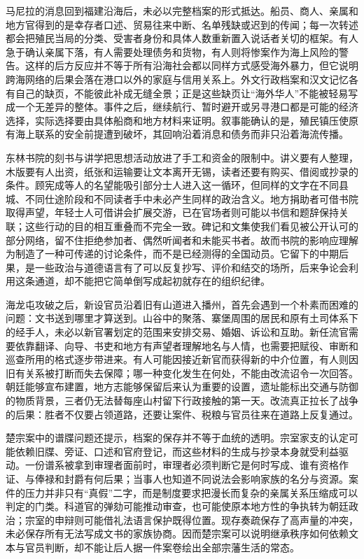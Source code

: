 马尼拉的消息回到福建沿海后，未必以完整档案的形式抵达。船员、商人、亲属和地方官得到的是幸存者口述、贸易往来中断、名单残缺或迟到的传闻；每一次转述都会把殖民当局的分类、受害者身份和具体人数重新置入说话者关切的框架。有人急于确认亲属下落，有人需要处理债务和货物，有人则将惨案作为海上风险的警告。这样的后方反应并不等于所有沿海社会都以同样方式感受海外暴力，但它说明跨海网络的后果会落在港口以外的家庭与信用关系上。外文行政档案和汉文记忆各有自己的缺页，不能彼此补成无缝全景；正是这些缺页让“海外华人”不能被轻易写成一个无差异的整体。事件之后，继续航行、暂时避开或另寻港口都是可能的经济选择，实际选择要由具体船商和地方材料来证明。叙事能确认的是，殖民镇压使原有海上联系的安全前提遭到破坏，其回响沿着消息和债务而非只沿着海流传播。

东林书院的刻书与讲学把思想活动放进了手工和资金的限制中。讲义要有人整理，木版要有人出资，纸张和运输要让文本离开无锡，读者还要有购买、借阅或抄录的条件。顾宪成等人的名望能吸引部分士人进入这一循环，但同样的文字在不同县城、不同仕途阶段和不同读者手中未必产生同样的政治含义。地方捐助者可借书院取得声望，年轻士人可借讲会扩展交游，已在官场者则可能以书信和题辞保持关联；这些行动的目的相互重叠而不完全一致。碑记和文集使我们看见被公开认可的部分网络，留不住拒绝参加者、偶然听闻者和未能买书者。故而书院的影响应理解为制造了一种可传递的讨论条件，而不是已经测得的全国动员。它留下的中期后果，是一些政治与道德语言有了可以反复抄写、评价和结交的场所，后来争论会利用这条通道，却不能把它简单倒写成起初就存在的组织纪律。

海龙屯攻破之后，新设官员沿着旧有山道进入播州，首先会遇到一个朴素而困难的问题：文书送到哪里才算送到。山谷中的聚落、寨堡周围的居民和原有土司体系下的经手人，未必以新官署划定的范围来安排交易、婚姻、诉讼和互助。新任流官需要依靠翻译、向导、书吏和地方有声望者理解地名与人情，也需要把赋役、审断和巡查所用的格式逐步带进来。有人可能因接近新官而获得新的中介位置，有人则因旧有关系被打断而失去保障；哪一种变化发生在何处，不能由改流诏令一次回答。朝廷能够宣布建置，地方志能够保留后来认为重要的设置，遗址能标出交通与防御的物质背景，三者仍无法替每座山村留下行政接触的第一天。改流真正拉长了战争的后果：胜者不仅要占领道路，还要让案件、税粮与官员往来在道路上反复通过。

楚宗案中的谱牒问题还提示，档案的保存并不等于血统的透明。宗室家支的认定可能依赖旧牒、旁证、口述和官府登记，而这些材料的生成与抄录本身就受利益驱动。一份谱系被拿到审理者面前时，审理者必须判断它是何时写成、谁有资格作证、与俸禄和封爵有何后果；当事人也知道不同说法会影响家族的名分与资源。案件的压力并非只有“真假”二字，而是制度要求把漫长而复杂的亲属关系压缩成可以判定的门类。科道官的弹劾可能推动审查，也可能使原本地方性的争执转为朝廷政治；宗室的申辩则可能借礼法语言保护既得位置。现存奏疏保存了高声量的冲突，未必保存所有无法写成文书的家族协商。因而楚宗案可以说明继承秩序如何依赖文本与官员判断，却不能让后人据一件案卷绘出全部宗藩生活的常态。

